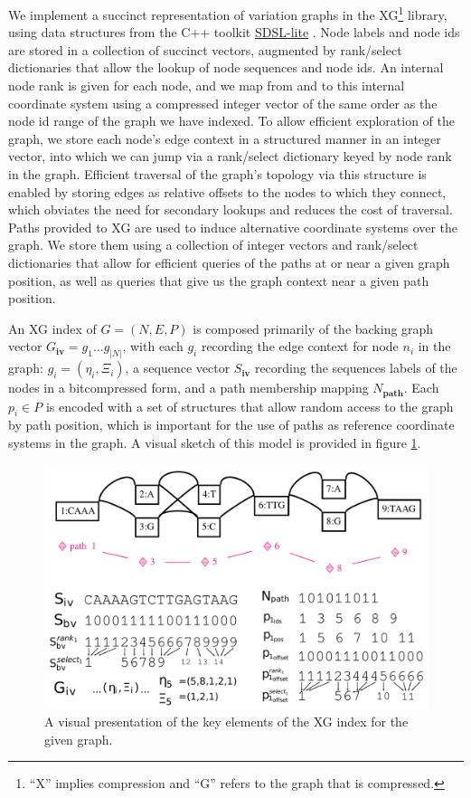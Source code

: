 \documentclass[a4paper,12pt,numbered,oneside]{Classes/PhDThesisPSnPDF}
\begin{document}
We implement a succinct representation of variation graphs in the XG\footnote{``X'' implies compression and ``G'' refers to the graph that is compressed.} library, using data structures from the C++ toolkit \href{https://github.com/simongog/sdsl-lite}{SDSL-lite} \cite{gbmp2014sea}.
Node labels and node ids are stored in a collection of succinct vectors, augmented by rank/select dictionaries that allow the lookup of node sequences and node ids.
An internal node rank is given for each node, and we map from and to this internal coordinate system using a compressed integer vector of the same order as the node id range of the graph we have indexed.
To allow efficient exploration of the graph, we store each node's edge context in a structured manner in an integer vector, into which we can jump via a rank/select dictionary keyed by node rank in the graph.
Efficient traversal of the graph's topology via this structure is enabled by storing edges as relative offsets to the nodes to which they connect, which obviates the need for secondary lookups and reduces the cost of traversal.
Paths provided to XG are used to induce alternative coordinate systems over the graph. 
We store them using a collection of integer vectors and rank/select dictionaries that allow for efficient queries of the paths at or near a given graph position, as well as queries that give us the graph context near a given path position.

An XG index of $G = (N, E, P)$ is composed primarily of the backing graph vector $G_\textbf{iv} = g_1 \ldots g_{|N|}$, with each $g_i$ recording the edge context for node $n_i$ in the graph: $g_i = ( \eta_i, \Xi_i)$, a sequence vector $S_\textbf{iv}$ recording the sequences labels of the nodes in a bitcompressed form, and a path membership mapping $N_\textbf{path}$.
Each $p_i \in P$ is encoded with a set of structures that allow random access to the graph by path position, which is important for the use of paths as reference coordinate systems in the graph.
A visual sketch of this model is provided in figure \ref{fig:xg_index}.

\begin{figure}[htbp!]
  \includegraphics[width=\textwidth]{Chapter2/Figs/xg_index_sketch_nice.pdf}
  \caption[A sketch of the XG index]{
    A visual presentation of the key elements of the XG index for the given graph.
  }
  \label{fig:xg_index}
\end{figure}
\end{document}
